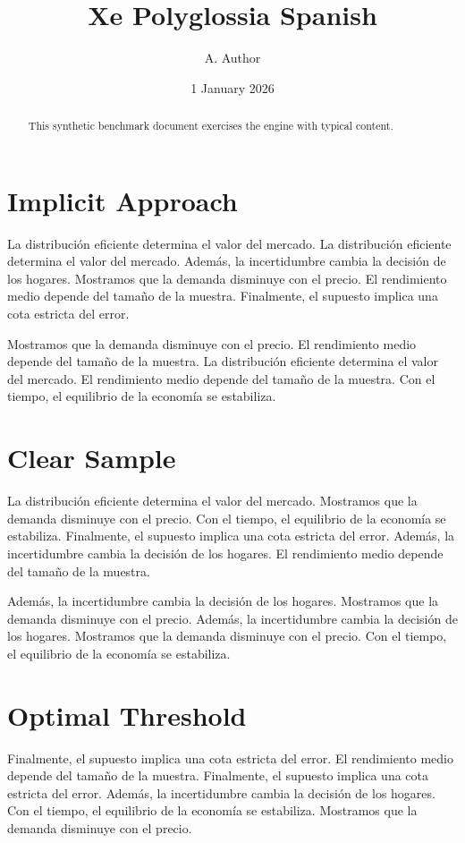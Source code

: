 \documentclass[11pt]{article}
\title{Xe Polyglossia Spanish}
\author{A. Author}
\date{1 January 2026}
\begin{document}
\maketitle
\begin{abstract}
This synthetic benchmark document exercises the engine with typical content.
\end{abstract}
\tableofcontents
\section{Implicit Approach}\label{sec:1}

La distribución eficiente determina el valor del mercado. La distribución eficiente determina el valor del mercado. Además, la incertidumbre cambia la decisión de los hogares. Mostramos que la demanda disminuye con el precio. El rendimiento medio depende del tamaño de la muestra. Finalmente, el supuesto implica una cota estricta del error.

Mostramos que la demanda disminuye con el precio. El rendimiento medio depende del tamaño de la muestra. La distribución eficiente determina el valor del mercado. El rendimiento medio depende del tamaño de la muestra. Con el tiempo, el equilibrio de la economía se estabiliza.

\section{Clear Sample}\label{sec:2}

La distribución eficiente determina el valor del mercado. Mostramos que la demanda disminuye con el precio. Con el tiempo, el equilibrio de la economía se estabiliza. Finalmente, el supuesto implica una cota estricta del error. Además, la incertidumbre cambia la decisión de los hogares. El rendimiento medio depende del tamaño de la muestra.

Además, la incertidumbre cambia la decisión de los hogares. Mostramos que la demanda disminuye con el precio. Además, la incertidumbre cambia la decisión de los hogares. Mostramos que la demanda disminuye con el precio. Con el tiempo, el equilibrio de la economía se estabiliza.

\section{Optimal Threshold}\label{sec:3}

Finalmente, el supuesto implica una cota estricta del error. El rendimiento medio depende del tamaño de la muestra. Finalmente, el supuesto implica una cota estricta del error. Además, la incertidumbre cambia la decisión de los hogares. Con el tiempo, el equilibrio de la economía se estabiliza. Mostramos que la demanda disminuye con el precio.
\end{document}
